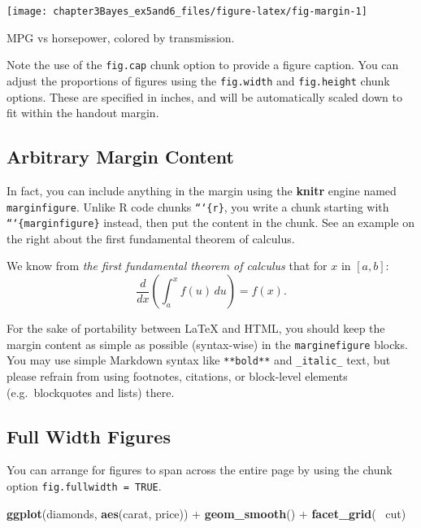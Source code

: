 \documentclass[]{tufte-handout}
\newenvironment{Shaded}{}{}
\newcommand{\KeywordTok}[1]{\textcolor[rgb]{0.00,0.44,0.13}{\textbf{{#1}}}}
\newcommand{\StringTok}[1]{\textcolor[rgb]{0.25,0.44,0.63}{{#1}}}
\newcommand{\NormalTok}[1]{{#1}}
\begin{document}
\begin{marginfigure}
\texttt{[image: chapter3Bayes\_ex5and6\_files/figure-latex/fig-margin-1]} \caption[MPG vs horsepower, colored by transmission]{MPG vs horsepower, colored by transmission.}\label{fig:fig-margin}
\end{marginfigure}

Note the use of the \texttt{fig.cap} chunk option to provide a figure
caption. You can adjust the proportions of figures using the
\texttt{fig.width} and \texttt{fig.height} chunk options. These are
specified in inches, and will be automatically scaled down to fit within
the handout margin.

\subsection{Arbitrary Margin Content}\label{arbitrary-margin-content}

In fact, you can include anything in the margin using the \textbf{knitr}
engine named \texttt{marginfigure}. Unlike R code chunks
\texttt{```\{r\}}, you write a chunk starting with
\texttt{```\{marginfigure\}} instead, then put the content in the chunk.
See an example on the right about the first fundamental theorem of
calculus.

\begin{marginfigure}
We know from \emph{the first fundamental theorem of calculus} that for
\(x\) in \([a, b]\):
\[\frac{d}{dx}\left( \int_{a}^{x} f(u)\,du\right)=f(x).\]
\end{marginfigure}

For the sake of portability between LaTeX and HTML, you should keep the
margin content as simple as possible (syntax-wise) in the
\texttt{marginefigure} blocks. You may use simple Markdown syntax like
\texttt{**bold**} and \texttt{\_italic\_} text, but please refrain from
using footnotes, citations, or block-level elements (e.g.~blockquotes
and lists) there.

\subsection{Full Width Figures}\label{full-width-figures}

You can arrange for figures to span across the entire page by using the
chunk option \texttt{fig.fullwidth = TRUE}.

\begin{Shaded}
\begin{Highlighting}[]
\KeywordTok{ggplot}\NormalTok{(diamonds, }\KeywordTok{aes}\NormalTok{(carat, price)) +}\StringTok{ }\KeywordTok{geom_smooth}\NormalTok{() +}
\StringTok{  }\KeywordTok{facet_grid}\NormalTok{(~}\StringTok{ }\NormalTok{cut)}
\end{Highlighting}
\end{Shaded}
\end{document}
